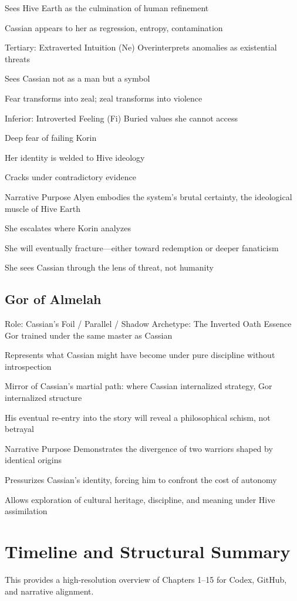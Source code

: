 \documentclass[12pt,oneside]{book}
\begin{document}
Sees Hive Earth as the culmination of human refinement


Cassian appears to her as regression, entropy, contamination


Tertiary: Extraverted Intuition (Ne)
Overinterprets anomalies as existential threats


Sees Cassian not as a man but a symbol


Fear transforms into zeal; zeal transforms into violence


Inferior: Introverted Feeling (Fi)
Buried values she cannot access


Deep fear of failing Korin


Her identity is welded to Hive ideology


Cracks under contradictory evidence


Narrative Purpose
Alyen embodies the system’s brutal certainty, the ideological muscle of Hive Earth


She escalates where Korin analyzes


She will eventually fracture—either toward redemption or deeper fanaticism


She sees Cassian through the lens of threat, not humanity


\section{Gor of Almelah}

Role: Cassian’s Foil / Parallel / Shadow
 Archetype: The Inverted Oath
Essence
Gor trained under the same master as Cassian


Represents what Cassian might have become under pure discipline without introspection


Mirror of Cassian’s martial path: where Cassian internalized strategy, Gor internalized structure


His eventual re-entry into the story will reveal a philosophical schism, not betrayal


Narrative Purpose
Demonstrates the divergence of two warriors shaped by identical origins


Pressurizes Cassian’s identity, forcing him to confront the cost of autonomy


Allows exploration of cultural heritage, discipline, and meaning under Hive assimilation



\chapter{Timeline and Structural Summary}
This provides a high-resolution overview of Chapters 1–15 for Codex, GitHub, and narrative alignment.
\end{document}
